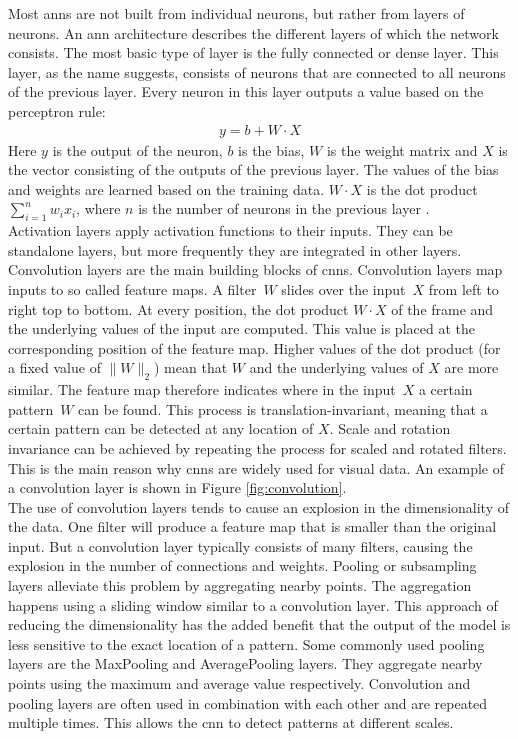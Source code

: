 Most \glspl{ann} are not built from individual neurons, but rather from layers of neurons. An \gls{ann} architecture describes the different layers of which the network consists. The most basic type of layer is the fully connected or dense layer. This layer, as the name suggests, consists of neurons that are connected to all neurons of the previous layer. Every neuron in this layer outputs a value based on the perceptron rule:
\begin{align*}
	y = b + W \cdot X
\end{align*} 
Here $y$ is the output of the neuron, $b$ is the bias, $W$ is the weight matrix and $X$ is the vector consisting of the outputs of the previous layer. The values of the bias and weights are learned based on the training data. $W \cdot X$ is the dot product $\sum_{i=1}^nw_ix_i$, where $n$ is the number of neurons in the previous layer \cite{perceptron_wikipedia}.\\

Activation layers apply activation functions to their inputs. They can be standalone layers, but more frequently they are integrated in other layers.\\ 

Convolution layers \cite{mnist} are the main building blocks of \glspl{cnn}. Convolution layers map inputs to so called feature maps. A filter~$W$ slides over the input~$X$ from left to right top to bottom. At every position, the dot product $W\cdot X$ of the frame and the underlying values of the input are computed. This value is placed at the corresponding position of the feature map. Higher values of the dot product (for a fixed value of $\|W\|_2$) mean that $W$ and the underlying values of $X$ are more similar. The feature map therefore indicates where in the input~$X$ a certain pattern~$W$ can be found. This process is translation-invariant, meaning that a certain pattern can be detected at any location of $X$. Scale and rotation invariance can be achieved by repeating the process for scaled and rotated filters. This is the main reason why \glspl{cnn} are widely used for visual data. An example of a convolution layer is shown in Figure \ref{fig:convolution}.\\

The use of convolution layers tends to cause an explosion in the dimensionality of the data. One filter will produce a feature map that is smaller than the original input. But a convolution layer typically consists of many filters, causing the explosion in the number of connections and weights. Pooling or subsampling layers \cite{mnist} alleviate this problem by aggregating nearby points. The aggregation happens using a sliding window similar to a convolution layer. This approach of reducing the dimensionality has the added benefit that the output of the model is less sensitive to the exact location of a pattern. Some commonly used pooling layers are the MaxPooling and AveragePooling layers. They aggregate nearby points using the maximum and average value respectively. Convolution and pooling layers are often used in combination with each other and are repeated multiple times. This allows the \gls{cnn} to detect patterns at different scales.\\
 
